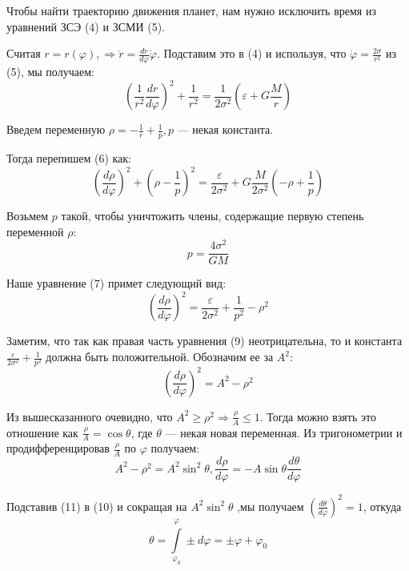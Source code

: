 \documentclass[12pt]{article}
\newcommand{\te}{\ensuremath{\Rightarrow}}
\begin{document}
Чтобы найти траекторию движения планет, нам нужно исключить время из уравнений ЗСЭ (4) и ЗСМИ (5).

Считая $ r = r(\varphi), \te \dot{r} = \frac{dr}{d\varphi} \dot{\varphi}$. Подставим это в (4) и используя, что $ \dot{\varphi} = \frac{2\sigma}{r^2} $ из (5), мы получаем: 
\begin{equation}
\left(\dfrac{1}{r^2}\dfrac{dr}{d\varphi}\right)^2 + \dfrac{1}{r^2} = \dfrac{1}{2\sigma^2}\left(\varepsilon + G\dfrac Mr\right)
\end{equation}

Введем переменную $ \rho = -\frac 1r + \frac 1p, p $ --- некая константа.

 Тогда перепишем (6) как:
\begin{equation}
\left( \dfrac{d\rho}{d\varphi}\right)^2 + \left(\rho - \dfrac 1p \right)^2 = \dfrac{\varepsilon}{2\sigma^2} + G \dfrac{M}{2\sigma^2} \left(-\rho +\frac 1p  \right)
\end{equation}

Возьмем $ p $ такой, чтобы уничтожить члены, содержащие первую степень переменной $ \rho $:
\begin{equation}
p = \dfrac{4\sigma^2}{GM}
\end{equation}

Наше уравнение (7) примет следующий вид: 
\begin{equation}
\left( \dfrac{d\rho}{d\varphi}\right)^2 = \dfrac{\varepsilon}{2\sigma^2} + \dfrac{1}{p^2} - \rho^2
\end{equation}
 
 Заметим, что так как правая часть уравнения (9) неотрицательна, то и константа $ \frac{\varepsilon}{2\sigma^2} + \frac{1}{p^2} $ должна быть положительной. Обозначим ее за $ A^2 $:
 \begin{equation}
 \left( \dfrac{d\rho}{d\varphi}\right)^2  = A^2 - \rho^2
 \end{equation}
 
 Из вышесказанного очевидно, что $ A^2 \geq \rho^2 \te \frac{\rho}{A} \leq 1 $. Тогда можно взять это отношение как $\frac{\rho}{A} =  \cos \theta $, где $ \theta $ --- некая новая переменная. Из тригонометрии и продифференцировав $ \frac{\rho}{A} $ по $ \varphi $ получаем: 
 \begin{equation}
A^2 - \rho^2 = A^2 \sin^2 \theta,   \dfrac{d\rho}{d\varphi} = -A\sin\theta \dfrac{d\theta}{d\varphi}
 \end{equation}
 
 Подставив (11) в (10) и сокращая на $ A^2\sin^2\theta $ ,мы получаем $ (\frac{d\theta}{d\varphi})^2 = 1 $, откуда 
 \begin{equation}
 \theta  = \int\limits_{\varphi_0}^{\varphi}\pm d\varphi= \pm \varphi + \varphi_0
 \end{equation}
 
\end{document}
